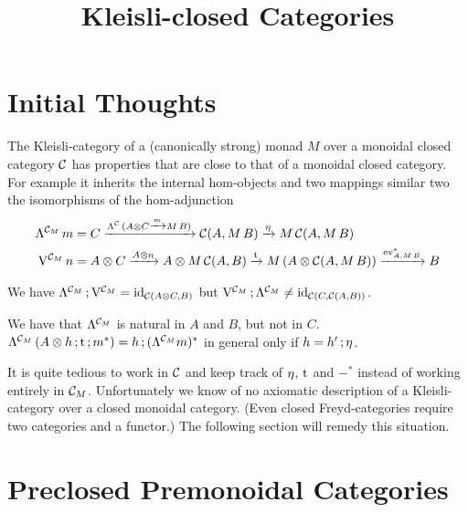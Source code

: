 \documentclass[runningheads,envcountsame]{llncs}
\newcommand{\monad}{M}
\begin{document}
\title{Kleisli-closed Categories}
\maketitle

\section{Initial Thoughts}

The Kleisli-category of a (canonically strong) monad $\monad$ over a monoidal closed category $\mathcal{C}$ has properties that are close to that of a monoidal closed category. For example it inherits the internal hom-objects and two mappings similar two the isomorphisms of the hom-adjunction
\begin{align}
    \curry[\C_\monad]\,m &= C \xrightarrow{\curry[\C]\,(\tensor{A}{C} \xrightarrow{m} \monad\,B)} \C(A, \monad\,B) \xrightarrow{\munit} \monad\,\C(A, \monad\,B) \\
    \uncurry[\C_\monad]\,n &= \tensor{A}{C} \xrightarrow{\tensor{A}{n}} \tensor{A}{\monad\,\C(A, B)} \xrightarrow{\mstrength} \monad\,(\tensor{A}{\C(A, \monad\,B)}) \xrightarrow{\eval_{A, \monad\,B}^*} B 
\end{align}

We have $\comp{\curry[\C_\monad]}{\uncurry[\C_\monad]} = \id_{\C(\tensor{A}{C}, B)}$ but $\comp{\uncurry[\C_\monad]}{\curry[\C_\monad]} \neq \id_{\C(C, \C(A, B))}$.

We have that $\curry[\C_\monad]$ is natural in $A$ and $B$, but not in $C$. $\curry[\C_\monad]\,(\comp{\tensor{A}{h}}{\comp{\mstrength}{m^*}}) = \comp{h}{(\curry[\C_\monad] m)^*}$ in general only if $h = \comp{h'}{\munit}$.

It is quite tedious to work in $\mathcal{C}$ and keep track of $\munit$, $\mathrm{t}$ and $-^*$ instead of working entirely in $\C_\monad$. Unfortunately we know of no axiomatic description of a Kleisli-category over a closed monoidal category. (Even closed Freyd-categories require two categories and a functor.) The following section will remedy this situation.

\section{Preclosed Premonoidal Categories}
\end{document}
